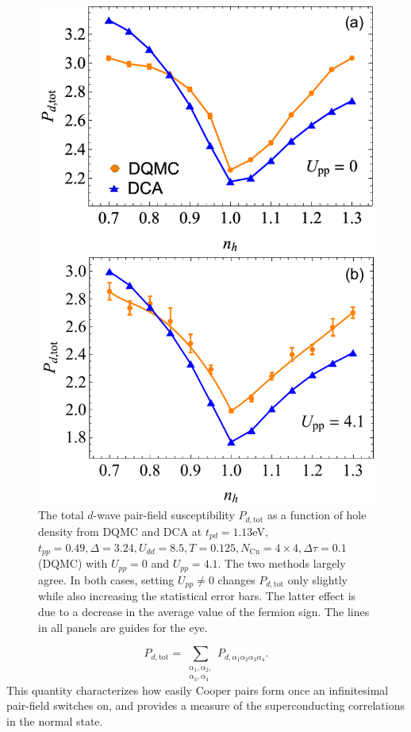 \documentclass[reprint,nofootinbib,nobibnotes,amsmath,amssymb,aps,prb,floatfix]{revtex4-2}
\newcommand{\beq}{\begin{equation}}
\newcommand{\eeq}{\end{equation}}
\begin{document}
\begin{figure}[t!]
\centering
\includegraphics[width=0.8\linewidth]{PdvaryUpp.pdf}
\caption{The total $d$-wave pair-field susceptibility $P_{d,\text{tot}}$ as a function of hole density from DQMC and DCA at $t_{pd}=1.13$eV, $t_{pp}=0.49, \Delta=3.24, U_{dd}=8.5, T=0.125, N_{\textrm{Cu}}=4\times 4, \Delta\tau=0.1$ (DQMC) with $U_{pp}=0$ and $U_{pp}=4.1$. The two methods largely agree. In both cases, 
setting $U_{pp}\ne 0$ changes $P_{d,\text{tot}}$ only slightly while also increasing the statistical error bars. The latter effect 
is due to a decrease in the average value of the fermion sign. The lines in all panels are guides for the eye.
}
\label{Upp}
\end{figure}

\beq
P_{d,\text{tot}}=\sum_{\substack{\alpha_1,\alpha_2,\\\alpha_3,\alpha_4}} P_{d,\alpha_1\alpha_2\alpha_3\alpha_4}.
\eeq
This quantity characterizes how easily Cooper pairs form once an infinitesimal pair-field switches on, and provides a measure of the superconducting correlations in the normal state.
\end{document}
